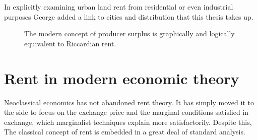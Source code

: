 In explicitly examining urban land rent from residential or even industrial purposes  George added a link to cities and distribution that this thesis takes up. 

\begin{figure}[!ht]
\begin{center}
    
\caption{The modern concept of producer surplus is graphically and logically equivalent to Riccardian rent.}
\label{fig-producer-surplus}
\end{center}
\end{figure}


\section{Rent in modern economic theory} \label{section-rent-modern-economics}
Neoclassical economics has not abandoned rent theory. It has simply moved it to the side to focus  on the exchange price and the marginal conditions satisfied in exchange, which marginalist techniques explain more satisfactorily. Despite this, The  classical concept of rent  is embedded in a great deal of standard analysis.

